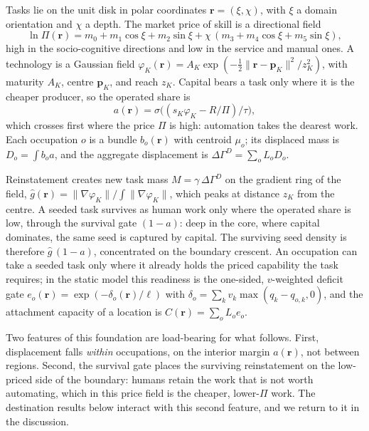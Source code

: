 \documentclass[12pt, a4paper]{article}
\newcommand{\rr}{\mathbf{r}}
\begin{document}
Tasks lie on the unit disk in polar coordinates $\rr = (\xi,\chi)$, with
$\xi$ a domain orientation and $\chi$ a depth. The market price of skill
is a directional field
\begin{equation}
\ln \Pi(\rr) = m_0 + m_1\cos\xi + m_2\sin\xi
+ \chi\,(m_3 + m_4\cos\xi + m_5\sin\xi),
\end{equation}
high in the socio-cognitive directions and low in the service and manual
ones. A technology is a Gaussian field
$\varphi_K(\rr) = A_K\exp(-\tfrac12\lVert\rr-\mathbf p_K\rVert^2/z_K^2)$,
with maturity $A_K$, centre $\mathbf p_K$, and reach $z_K$. Capital bears
a task only where it is the cheaper producer, so the operated share is
\begin{equation}
a(\rr) = \sigma\!\big((s_K\varphi_K - R/\Pi)/\tau\big),
\label{eq:operated}
\end{equation}
which crosses first where the price $\Pi$ is high: automation takes the
dearest work. Each occupation $o$ is a bundle $b_o(\rr)$ with centroid
$\mu_o$; its displaced mass is $D_o = \int b_o a$, and the aggregate
displacement is $\Delta\Gamma^D = \sum_o L_o D_o$.

Reinstatement creates new task mass $M = \gamma\,\Delta\Gamma^D$ on the
gradient ring of the field,
$\hat g(\rr) = \lVert\nabla\varphi_K\rVert / \int\lVert\nabla\varphi_K\rVert$,
which peaks at distance $z_K$ from the centre. A seeded task survives as
human work only where the operated share is low, through the survival
gate $(1-a)$: deep in the core, where capital dominates, the same seed is
captured by capital. The surviving seed density is therefore
$\hat g\,(1-a)$, concentrated on the boundary crescent. An occupation can
take a seeded task only where it already holds the priced capability the
task requires; in the static model this readiness is the one-sided,
$v$-weighted deficit gate $e_o(\rr) = \exp(-\delta_o(\rr)/\ell)$ with
$\delta_o = \sum_k v_k\max(q_k - q_{o,k},0)$, and the attachment capacity
of a location is $C(\rr) = \sum_o L_o e_o$.

Two features of this foundation are load-bearing for what follows. First,
displacement falls \emph{within} occupations, on the interior margin
$a(\rr)$, not between regions. Second, the survival gate places the
surviving reinstatement on the low-priced side of the boundary: humans
retain the work that is not worth automating, which in this price field
is the cheaper, lower-$\Pi$ work. The destination results below interact
with this second feature, and we return to it in the discussion.
\end{document}
